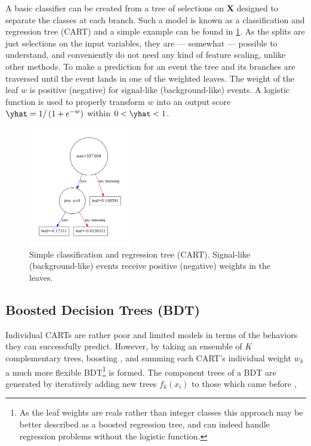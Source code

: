 A basic classifier can be created from a tree of selections on $\mathbf{X}$ designed to
separate the classes at each branch.
Such a model is known as a classification and regression tree (CART) \cite{Breiman:2253780}
and a simple example can be found in \cref{ml:supervised:CART:small_example_CART}.
As the splits are just selections on the input variables,
they are --- somewhat --- possible to understand,
and conveniently do not need any kind of feature scaling, unlike other methods.
To make a prediction for an event the tree and its branches are traversed
until the event lands in one of the weighted leaves.
The weight of the leaf $w$ is positive (negative) for signal-like (background-like) events.
A logistic function is used to properly transform $w$ into an output score
$\yhat = 1 /\left(1+e^{-w}\right)$ within $0 < \yhat < 1$.

\begin{figure}[H]
\centering
\includegraphics[width=0.4\textwidth]{figures/ml/tree7_g2000_n1200.pdf}
\caption{
Simple classification and regression tree (CART).
Signal-like (background-like) events receive positive (negative) weights in the leaves.
}
\label{ml:supervised:CART:small_example_CART}
\end{figure}


\subsection{Boosted Decision Trees (BDT)}
\label{ml:supervised:BDT}

Individual CARTs are rather poor and limited models
in terms of the behaviors they can successfully predict.
However, by taking an ensemble of $K$ complementary trees, \ie boosting \cite{FREUND1997119,friedman2000},
and summing each CART's individual weight $w_{k}$ a much more flexible BDT\footnote{As the leaf weights
are reals rather than integer classes this approach may be better described as a boosted regression tree,
and can indeed handle regression problems without the logistic function.} is formed.
The component trees of a BDT are generated by iteratively adding new trees $f_{k}\left(x_{i}\right)$ to those which came before \cite{XGBoost},

